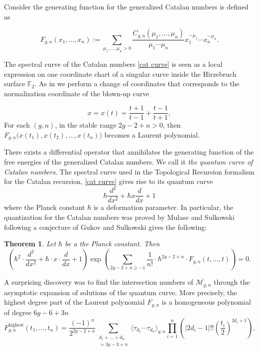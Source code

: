 \documentclass{amsart}
\newcommand{\be}{\begin{equation}}
\newcommand{\ee}{\end{equation}}
\newcommand{\la}{{\langle}}
\newcommand{\ra}{{\rangle}}
\newtheorem{Thm}[Lem]{Theorem}
\theoremstyle{definition}
\begin{document}
Consider the generating function for the generalized Catalan numbers is defined as

\be
\label{F}
F_{g,n}(x_1,\dots,x_n)
:= \sum_{\mu_1,\dots,\mu_n>0}\frac{C_{g,n}(\mu_1,\dots,\mu_n)}
{\mu_1\cdots\mu_n}x_1^{-\mu_1}\cdots 
x_n^{-\mu_n}.
\ee

The spectral curve of the Catalan numbers \eqref{cat curve} is seen as a local expression on one coordinate chart of a singular curve inside the Hirzebruch surface $\mathbb{F}_2$. As in \cite{DMSS} we perform  a change of coordinates that corresponds to the normalization coordinate of the blown-up curve 

\be\label{xt}
x = x(t) = \frac{t+1}{t-1}+\frac{t-1}{t+1},
\ee
For each $(g,n)$, in the stable range $2g-2+n>0$, then $F_{g,n}\big(x(t_1),x(t_2),\dots,x(t_n)\big)
$ becomes a Laurent polynomial. 

There exists a differential operator
that annihilates the generating function of the free energies of the generalized Catalan numbers. We call it {\it the quantum curve of Catalan numbers}. The spectral curve used in the Topological Recursion formalism for the Catalan recursion, \eqref{cat curve} gives rise to its quantum curve $$\hbar \frac{d^2}{dx^2}+ \hbar x\frac{d}{dx} +1$$ where the Planck constant $\hbar$ is a deformation parameter.  In particular, the  quantization for the Catalan numbers was proved by Mulase and Sulkowski following a conjecture of Gukov and Sulkowski gives the following:


\begin{Thm} \label{thm MS} Let $\hbar$
	be a the Planck constant. Then
	\begin{equation}\label{quantum curve}
	\left(\hbar^2 \cdot \frac{d^2}{dx^2}+\hbar \cdot x \cdot \frac{d}{dx}+1\right) 
	\exp\left(\sum_{2g-2+n\ge -1}\frac{1}{n!}\cdot\hbar^{2g-2+n}\cdot F_{g,n}(t,\dots,t)
	\right)=0.
	\end{equation}
\end{Thm}








A surprising discovery was to find the intersection numbers of 
$\overline{\mathcal{M}_{g,n}}$ through the 
asymptotic expansion of solutions of the quantum curve. More precisely, the highest degree part of the Laurent polynomial $F_{g,n}$
is a homogeneous polynomial of degree
$6g-6+3n$
\be
\label{topdegree}
F^{\text{highest}}_{g,n}(
t_1,\dots,t_n)
=
\frac{(-1)^n}{2^{2g-2+n}}
\sum_{\substack{d_1+\dots+d_n\\
		=3g-3+n}}\la \tau_{d_1}\cdots \tau_{d_n}\ra_{g,n}
\prod_{i=1}^n \left(
|2d_i-1|!!\left(\frac{t_i}{2}\right)^{2d_i+1}
\right),
\ee
\end{document}
